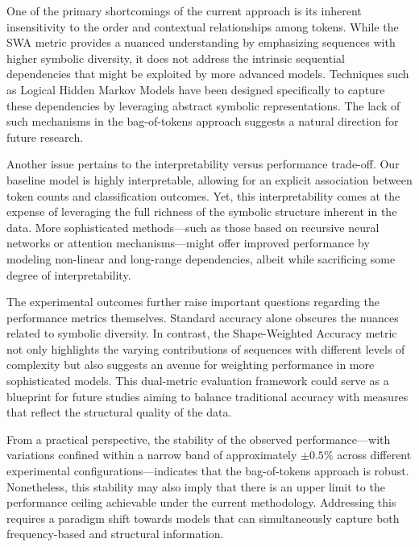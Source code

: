 \documentclass{article}
\begin{document}
One of the primary shortcomings of the current approach is its inherent insensitivity to the order and contextual relationships among tokens. While the SWA metric provides a nuanced understanding by emphasizing sequences with higher symbolic diversity, it does not address the intrinsic sequential dependencies that might be exploited by more advanced models. Techniques such as Logical Hidden Markov Models have been designed specifically to capture these dependencies by leveraging abstract symbolic representations. The lack of such mechanisms in the bag-of-tokens approach suggests a natural direction for future research.

Another issue pertains to the interpretability versus performance trade-off. Our baseline model is highly interpretable, allowing for an explicit association between token counts and classification outcomes. Yet, this interpretability comes at the expense of leveraging the full richness of the symbolic structure inherent in the data. More sophisticated methods—such as those based on recursive neural networks or attention mechanisms—might offer improved performance by modeling non-linear and long-range dependencies, albeit while sacrificing some degree of interpretability.

The experimental outcomes further raise important questions regarding the performance metrics themselves. Standard accuracy alone obscures the nuances related to symbolic diversity. In contrast, the Shape-Weighted Accuracy metric not only highlights the varying contributions of sequences with different levels of complexity but also suggests an avenue for weighting performance in more sophisticated models. This dual-metric evaluation framework could serve as a blueprint for future studies aiming to balance traditional accuracy with measures that reflect the structural quality of the data.

From a practical perspective, the stability of the observed performance—with variations confined within a narrow band of approximately \(\pm0.5\%\) across different experimental configurations—indicates that the bag-of-tokens approach is robust. Nonetheless, this stability may also imply that there is an upper limit to the performance ceiling achievable under the current methodology. Addressing this requires a paradigm shift towards models that can simultaneously capture both frequency-based and structural information.
\end{document}
